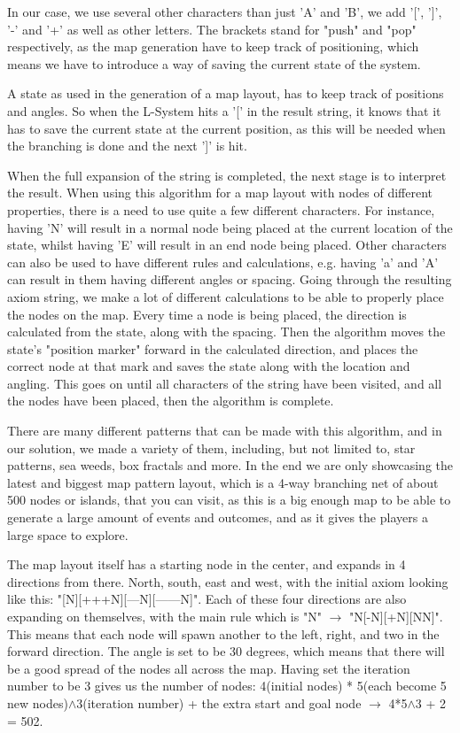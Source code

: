 In our case, we use several other characters than just 'A' and 'B', we add '[', ']', '-' and '+' as well as other letters. The brackets stand for "push" and "pop" respectively, as the map generation have to keep track of positioning, which means we have to introduce a way of saving the current state of the system.

A state as used in the generation of a map layout, has to keep track of positions and angles. So when the L-System hits a '[' in the result string, it knows that it has to save the current state at the current position, as this will be needed when the branching is done and the next ']' is hit. 

When the full expansion of the string is completed, the next stage is to interpret the result. When using this algorithm for a map layout with nodes of different properties, there is a need to use quite a few different characters. For instance, having 'N' will result in a normal node being placed at the current location of the state, whilst having 'E' will result in an end node being placed. Other characters can also be used to have different rules and calculations, e.g. having 'a' and 'A' can result in them having different angles or spacing.
Going through the resulting axiom string, we make a lot of different calculations to be able to properly place the nodes on the map. Every time a node is being placed, the direction is calculated from the state, along with the spacing. Then the algorithm moves the state's "position marker" forward in the calculated direction, and places the correct node at that mark and saves the state along with the location and angling.
This goes on until all characters of the string have been visited, and all the nodes have been placed, then the algorithm is complete.

There are many different patterns that can be made with this algorithm, and in our solution, we made a variety of them, including, but not limited to, star patterns, sea weeds, box fractals and more. 
In the end we are only showcasing the latest and biggest map pattern layout, which is a 4-way branching net of about 500 nodes or islands, that you can visit, as this is a big enough map to be able to generate a large amount of events and outcomes, and as it gives the players a large space to explore.

The map layout itself has a starting node in the center, and expands in 4 directions from there. North, south, east and west, with the initial axiom looking like this: "[N][+++N][---N][------N]". Each of these four directions are also expanding on themselves, with the main rule which is "N" $\rightarrow$ "N[-N][+N][NN]". This means that each node will spawn another to the left, right, and two in the forward direction. The angle is set to be 30 degrees, which means that there will be a good spread of the nodes all across the map. Having set the iteration number to be 3 gives us the number of nodes: 4(initial nodes) * 5(each become 5 new nodes)$\wedge$3(iteration number) + the extra start and goal node $\rightarrow$ 4*5$\wedge$3 + 2 = 502.

